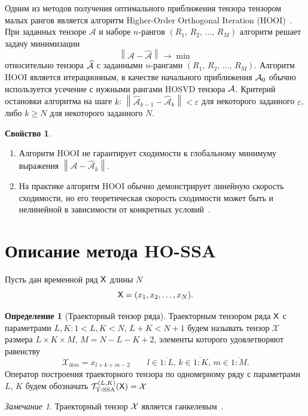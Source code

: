 \documentclass[specialist,
  substylefile=spbu_report.rtx,
subf,href,colorlinks=true, 12pt]{disser}
\theoremstyle{plain}
\theoremstyle{definition}
\newtheorem{definition}{Определение}[section]
\newtheorem{property}{Свойство}[section]
\theoremstyle{remark}
\newtheorem{remark}{Замечание}[section]
\begin{document}
Одним из методов получения оптимального приближения тензора тензором
малых рангов является алгоритм
Higher-Order Orthogonal Iteration (HOOI)~\cite{hooi, hooi-alg}.
При заданных тензоре $\mathcal{A}$ и наборе $n$-рангов $(R_1,\,
R_2,\, \ldots,\, R_M)$
алгоритм решает задачу минимизации
\[
  \left\|\mathcal{A}-\widehat{\mathcal{A}}\right\|\to \min
\]
относительно тензора $\widehat{\mathcal{A}}$ с заданными $n$-рангами
$(R_1,\, R_2,\, \ldots,\, R_M)$.
Алгоритм HOOI является итерационным, в качестве начального
приближения $\mathcal{A}_0$ обычно используется
усечение с нужными рангами HOSVD тензора $\mathcal{A}$.
Критерий остановки алгоритма на шаге $k$:
$\left\|\widehat{\mathcal{A}}_{k-1}-\widehat{\mathcal{A}}_k\right\| <
\varepsilon$
для некоторого заданного $\varepsilon$, либо $k \geqslant N$ для
некоторого заданного $N$.
\begin{property}
  \label{property:hooi-properties}
  \leavevmode
  \begin{enumerate}
    \item Алгоритм HOOI не гарантирует сходимости к глобальному
      минимуму выражения
      $\left\|\mathcal{A}-\widehat{\mathcal{A}}_k\right\|$.
    \item На практике алгоритм HOOI обычно демонстрирует линейную
      скорость сходимости, но его теоретическая скорость сходимости
      может быть и нелинейной в зависимости от конкретных
      условий~\cite{hooi-convergence}.
  \end{enumerate}
\end{property}

\section{Описание метода HO-SSA}\label{sec:HO-SSA-method-description}
Пусть дан временной ряд $\mathsf{X}$ длины $N$
\[
  \mathsf{X}=(x_1,x_2,\ldots,x_N).
\]
\begin{definition}[Траекторный тензор ряда]
  \label{def:traj-tensor-ssa}
  Траекторным тензором ряда $\mathsf{X}$ с параметрами $L,K: 1 < L,K < N,\,
  L + K < N + 1$
  будем называть тензор $\mathcal{X}$ размера $L\times K \times M,\,
  M=N-L-K+2$, элементы которого удовлетворяют равенству
  \[
    \mathcal{X}_{lkm}=x_{l+k+m-2}\qquad l\in \overline{1:L},\, k
    \in\overline{1:K},\, m \in\overline{1:M}.
  \]
  Оператор построения траекторного тензора по одномерному ряду с
  параметрами $L$, $K$ будем обозначать $\mathcal{T}_{\textrm{T-SSA}}^{(L,
  K)}(\mathsf{X}) = \mathcal{X}$
\end{definition}

\begin{remark}
  Траекторный тензор $\mathcal{X}$ является ганкелевым~\cite{hankel-tensor}.
\end{remark}
\end{document}
